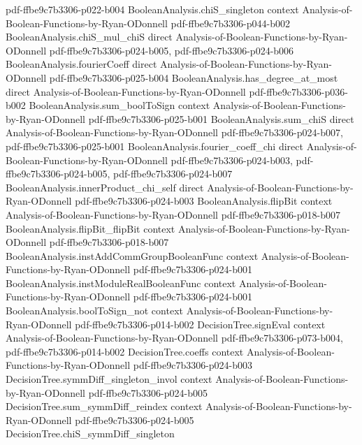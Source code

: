\begin{theorem}
  {pdf-ffbe9c7b3306-p022-b004}
\proofstep
  {BooleanAnalysis.chiS_singleton}
  {context}
  {Analysis-of-Boolean-Functions-by-Ryan-ODonnell}
  {pdf-ffbe9c7b3306-p044-b002}
\proofstep
  {BooleanAnalysis.chiS_mul_chiS}
  {direct}
  {Analysis-of-Boolean-Functions-by-Ryan-ODonnell}
  {pdf-ffbe9c7b3306-p024-b005,
    pdf-ffbe9c7b3306-p024-b006}
\proofstep
  {BooleanAnalysis.fourierCoeff}
  {direct}
  {Analysis-of-Boolean-Functions-by-Ryan-ODonnell}
  {pdf-ffbe9c7b3306-p025-b004}
\proofstep
  {BooleanAnalysis.has_degree_at_most}
  {direct}
  {Analysis-of-Boolean-Functions-by-Ryan-ODonnell}
  {pdf-ffbe9c7b3306-p036-b002}
\proofstep
  {BooleanAnalysis.sum_boolToSign}
  {context}
  {Analysis-of-Boolean-Functions-by-Ryan-ODonnell}
  {pdf-ffbe9c7b3306-p025-b001}
\proofstep
  {BooleanAnalysis.sum_chiS}
  {direct}
  {Analysis-of-Boolean-Functions-by-Ryan-ODonnell}
  {pdf-ffbe9c7b3306-p024-b007,
    pdf-ffbe9c7b3306-p025-b001}
\proofstep
  {BooleanAnalysis.fourier_coeff_chi}
  {direct}
  {Analysis-of-Boolean-Functions-by-Ryan-ODonnell}
  {pdf-ffbe9c7b3306-p024-b003,
    pdf-ffbe9c7b3306-p024-b005,
    pdf-ffbe9c7b3306-p024-b007}
\proofstep
  {BooleanAnalysis.innerProduct_chi_self}
  {direct}
  {Analysis-of-Boolean-Functions-by-Ryan-ODonnell}
  {pdf-ffbe9c7b3306-p024-b003}
\proofstep
  {BooleanAnalysis.flipBit}
  {context}
  {Analysis-of-Boolean-Functions-by-Ryan-ODonnell}
  {pdf-ffbe9c7b3306-p018-b007}
\proofstep
  {BooleanAnalysis.flipBit_flipBit}
  {context}
  {Analysis-of-Boolean-Functions-by-Ryan-ODonnell}
  {pdf-ffbe9c7b3306-p018-b007}
\proofstep
  {BooleanAnalysis.instAddCommGroupBooleanFunc}
  {context}
  {Analysis-of-Boolean-Functions-by-Ryan-ODonnell}
  {pdf-ffbe9c7b3306-p024-b001}
\proofstep
  {BooleanAnalysis.instModuleRealBooleanFunc}
  {context}
  {Analysis-of-Boolean-Functions-by-Ryan-ODonnell}
  {pdf-ffbe9c7b3306-p024-b001}
\proofstep
  {BooleanAnalysis.boolToSign_not}
  {context}
  {Analysis-of-Boolean-Functions-by-Ryan-ODonnell}
  {pdf-ffbe9c7b3306-p014-b002}
\proofstep
  {DecisionTree.signEval}
  {context}
  {Analysis-of-Boolean-Functions-by-Ryan-ODonnell}
  {pdf-ffbe9c7b3306-p073-b004,
    pdf-ffbe9c7b3306-p014-b002}
\proofstep
  {DecisionTree.coeffs}
  {context}
  {Analysis-of-Boolean-Functions-by-Ryan-ODonnell}
  {pdf-ffbe9c7b3306-p024-b003}
\proofstep
  {DecisionTree.symmDiff_singleton_invol}
  {context}
  {Analysis-of-Boolean-Functions-by-Ryan-ODonnell}
  {pdf-ffbe9c7b3306-p024-b005}
\proofstep
  {DecisionTree.sum_symmDiff_reindex}
  {context}
  {Analysis-of-Boolean-Functions-by-Ryan-ODonnell}
  {pdf-ffbe9c7b3306-p024-b005}
\proofstep
  {DecisionTree.chiS_symmDiff_singleton}

\end{theorem}
